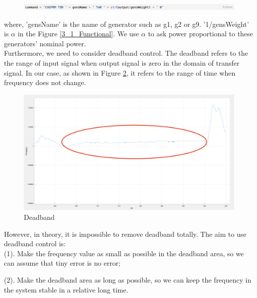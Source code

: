 \documentclass{report}
\begin{document}
\begin{figure}[htbp]
\centering
\includegraphics[width = .999\textwidth]{figure/3_3_code2.png}
\label{3_3_code2}
\end{figure}

where, 'gensName' is the name of generator such as g1, g2 or g9. '1/gensWeight' is $\alpha$ in the Figure \textcolor{red}{\ref{3_1_Functional}}. We use $\alpha$ to ask power proportional to these generators' nominal power. \\

Furthermore, we need to consider deadband control. The deadband refers to the the range of input signal when output signal is zero in the domain of transfer signal. In our case, as shown in Figure \textcolor{red}{\ref{3_3_deadband}}, it refers to the range of time when frequency does not change. \\

\begin{figure}[htbp]
\centering
\includegraphics[width = .999\textwidth]{figure/3_3_deadband.png}
\caption{Deadband}
\label{3_3_deadband}
\end{figure}


However, in theory, it is impossible to remove deadband totally. The aim to use deadband control is:\\
	
    (1). Make the frequency value as small as possible in the deadband area, so we can assume that tiny error is no error;
    
	(2). Make the deadband area as long as possible, so we can keep the frequency in the system stable in a relative long time. \\
\end{document}

